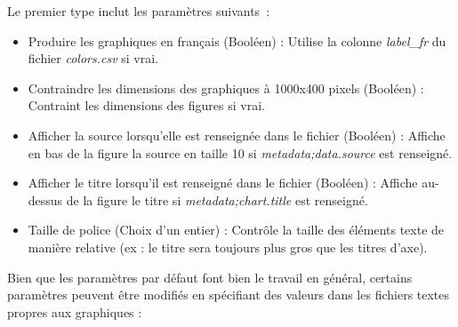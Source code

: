 \documentclass[11pt]{article}
\begin{document}
Le premier type inclut les paramètres suivants :
\begin{itemize}
    \item Produire les graphiques en français (Booléen) : Utilise la colonne \textit{label\_fr} du fichier \textit{colors.csv} si vrai.
    \item Contraindre les dimensions des graphiques à 1000x400 pixels (Booléen) : Contraint les dimensions des figures si vrai.
    \item Afficher la source lorsqu'elle est renseignée dans le fichier (Booléen) : Affiche en bas de la figure la source en taille 10 si \textit{metadata;data.source} est renseigné.
    \item Afficher le titre lorsqu'il est renseigné dans le fichier (Booléen) : Affiche au-dessus de la figure le titre si \textit{metadata;chart.title} est renseigné.
    \item Taille de police (Choix d'un entier) : Contrôle la taille des éléments texte de manière relative (ex : le titre sera toujours plus gros que les titres d'axe).
\end{itemize}

\vspace{1cm}
Bien que les paramètres par défaut font bien le travail en général, certains paramètres peuvent être modifiés en spécifiant des valeurs dans les fichiers textes propres aux graphiques :
\end{document}
